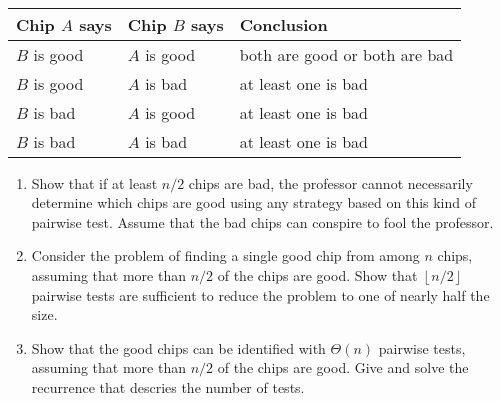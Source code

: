 \documentclass[12pt]{article}
\begin{document}
	\phantom{} \\
	\begin{tabular}{ l l l }
		Chip $A$ says & Chip $B$ says & Conclusion \\
		\hline
		$B$ is good & $A$ is good & both are good or both are bad \\
		$B$ is good & $A$ is bad & at least one is bad \\
		$B$ is bad & $A$ is good & at least one is bad \\
		$B$ is bad & $A$ is bad & at least one is bad
	\end{tabular}
	\pagebreak
	\begin{enumerate}
		\item Show that if at least $n/2$ chips are bad, the professor cannot necessarily determine which chips are good using any strategy based on this kind of pairwise test. Assume that the bad chips can conspire to fool the professor.
		\item Consider the problem of finding a single good chip from among $n$ chips, assuming that more than $n/2$ of the chips are good. Show that $\left\lfloor{n/2}\right\rfloor$ pairwise tests are sufficient to reduce the problem to one of nearly half the size.
		\item Show that the good chips can be identified with $\Theta(n)$ pairwise tests, assuming that more than $n/2$ of the chips are good. Give and solve the recurrence that descries the number of tests.
	\end{enumerate}
\end{document}
